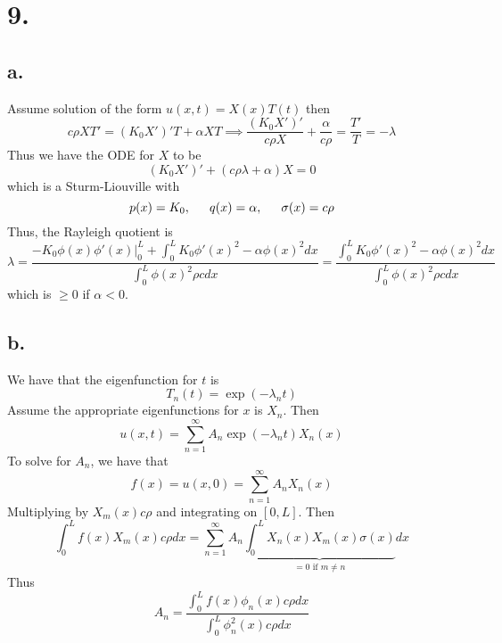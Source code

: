\documentclass[11pt]{article}
\theoremstyle{mystyle}
\theoremstyle{definition}
\begin{document}
\section*{9.}
\subsection*{a.}
Assume solution of the form $u(x,t) = X(x) T(t)$ then 
\[
  c \rho X T' = (K_0 X')' T + \alpha X T \implies \displaystyle\frac{(K_0 X')'}{c\rho X} + \displaystyle\frac{\alpha}{c \rho} = \displaystyle\frac{T'}{T} = -\lambda
\]
Thus we have the ODE for $X$ to be 
\[
  (K_0X')' + (c\rho \lambda + \alpha)X=0 
\]
which is a Sturm-Liouville with 
\[
  p(x) = K_0, \indent q(x) = \alpha, \indent \sigma(x) = c\rho
\]
Thus, the Rayleigh quotient is 
\[
  \lambda = \displaystyle\frac{-K_0 \phi(x) \phi'(x) |^L_0 + \int_0^L K_0 \phi'(x)^2 - \alpha \phi(x)^2 dx}{\int_0^L \phi(x)^2 \rho c dx} = \displaystyle\frac{\int_0^L K_0 \phi'(x)^2 - \alpha \phi(x)^2 dx}{\int_0^L \phi(x)^2 \rho c dx}  
\]
which is $\ge 0$ if $\alpha < 0$. 
\subsection*{b.}
We have that the eigenfunction for $t$ is 
\[
  T_n(t) = \exp(-\lambda_n t)
\]
Assume the appropriate eigenfunctions for $x$ is $X_n$. Then 
\[
  u(x,t) = \sum_{n=1}^\infty A_n  \exp(-\lambda_n t) X_n(x)
\]
To solve for $A_n$, we have that 
\[
  f(x) = u(x,0) = \sum_{n=1}^\infty A_n X_n(x)
\]
Multiplying by $X_m(x) c \rho$ and integrating on $[0,L]$. Then 
\[
  \int_0^L f(x) X_m(x) c \rho dx = \sum_{n=1}^\infty A_n \underbrace{\int_0^L X_n(x) X_m(x) \sigma(x)}_{ = 0 \text{ if } m \ne n} dx 
\]
Thus 
\[
  A_n = \displaystyle\frac{\int_0^L f(x) \phi_n(x) c\rho dx}{\int_0^L \phi^2_n(x) c \rho dx}
\]
\newpage
\end{document}
